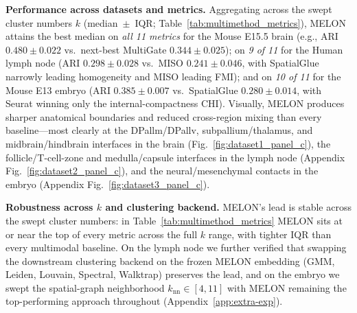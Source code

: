 \documentclass{article}
\theoremstyle{plain}
\theoremstyle{definition}
\begin{document}
\textbf{Performance across datasets and metrics.}
Aggregating across the swept cluster numbers $k$ (median~$\pm$~IQR; Table~\ref{tab:multimethod_metrics}), MELON attains the best median on \emph{all 11 metrics} for the Mouse E15.5 brain (e.g., ARI $0.480 \pm 0.022$ vs.\ next-best MultiGate $0.344 \pm 0.025$); on \emph{9 of 11} for the Human lymph node (ARI $0.298 \pm 0.028$ vs.\ MISO $0.241 \pm 0.046$, with SpatialGlue narrowly leading homogeneity and MISO leading FMI); and on \emph{10 of 11} for the Mouse E13 embryo (ARI $0.385 \pm 0.007$ vs.\ SpatialGlue $0.280 \pm 0.014$, with Seurat winning only the internal-compactness CHI). Visually, MELON produces sharper anatomical boundaries and reduced cross-region mixing than every baseline---most clearly at the DPallm/DPallv, subpallium/thalamus, and midbrain/hindbrain interfaces in the brain (Fig.~\ref{fig:dataset1_panel_c}), the follicle/T-cell-zone and medulla/capsule interfaces in the lymph node (Appendix Fig.~\ref{fig:dataset2_panel_c}), and the neural/mesenchymal contacts in the embryo (Appendix Fig.~\ref{fig:dataset3_panel_c}).

\textbf{Robustness across $k$ and clustering backend.}
MELON's lead is stable across the swept cluster numbers: in Table~\ref{tab:multimethod_metrics} MELON sits at or near the top of every metric across the full $k$ range, with tighter IQR than every multimodal baseline. On the lymph node we further verified that swapping the downstream clustering backend on the frozen MELON embedding (GMM, Leiden, Louvain, Spectral, Walktrap) preserves the lead, and on the embryo we swept the spatial-graph neighborhood $k_{\mathrm{nn}}\in[4,11]$ with MELON remaining the top-performing approach throughout (Appendix~\ref{app:extra-exp}).
\end{document}
